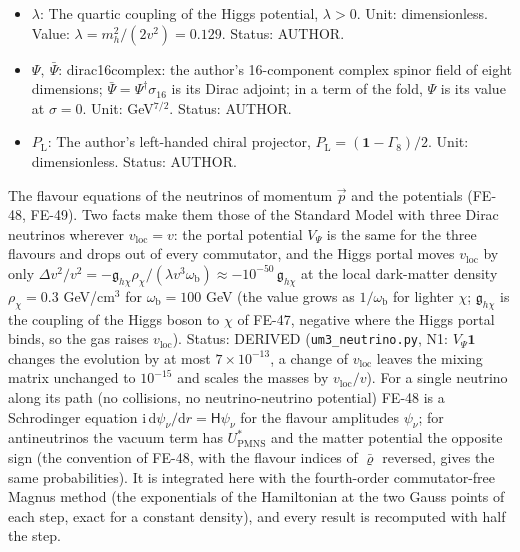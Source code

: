 \documentclass[
  10pt,
]{article}
\begin{document}
\begin{itemize}
  \(c_\Phi\): The Higgs-portal coupling of the left-handed half of
  dirac16complex (the right-handed half has none). Unit: GeV\(^{-5}\).
  Status: INVENTED.
\item
  \(\lambda\): The quartic coupling of the Higgs potential,
  \(\lambda > 0\). Unit: dimensionless. Value:
  \(\lambda = m_h^2/(2v^2) = 0.129\). Status: AUTHOR.
\item
  \(\Psi,\ \bar\Psi\): dirac16complex: the author's 16-component complex
  spinor field of eight dimensions;
  \(\bar\Psi = \Psi^\dagger\sigma_{16}\) is its Dirac adjoint; in a term
  of the fold, \(\Psi\) is its value at \(\sigma = 0\). Unit:
  GeV\(^{7/2}\). Status: AUTHOR.
\item
  \(P_{\mathrm{L}}\): The author's left-handed chiral projector,
  \(P_{\mathrm{L}} = (\mathbf{1} - \Gamma_8)/2\). Unit: dimensionless.
  Status: AUTHOR.
\end{itemize}

The flavour equations of the neutrinos of momentum \(\vec p\) and the
potentials (FE-48, FE-49). Two facts make them those of the Standard
Model with three Dirac neutrinos wherever \(v_{\mathrm{loc}} = v\): the
portal potential \(V_\Psi\) is the same for the three flavours and drops
out of every commutator, and the Higgs portal moves \(v_{\mathrm{loc}}\)
by only
\(\Delta v^2/v^2 = -\mathfrak{g}_{h\chi}\rho_\chi/(\lambda v^3\omega_{\mathrm{b}}) \approx -10^{-50}\,\mathfrak{g}_{h\chi}\)
at the local dark-matter density \(\rho_\chi = 0.3\) GeV/cm\(^3\) for
\(\omega_{\mathrm{b}} = 100\) GeV (the value grows as
\(1/\omega_{\mathrm{b}}\) for lighter \(\chi\); \(\mathfrak{g}_{h\chi}\)
is the coupling of the Higgs boson to \(\chi\) of FE-47, negative where
the Higgs portal binds, so the gas raises \(v_{\mathrm{loc}}\)). Status:
DERIVED (\texttt{um3\_neutrino.py}, N1: \(V_\Psi\mathbf{1}\) changes the
evolution by at most \(7\times10^{-13}\), a change of
\(v_{\mathrm{loc}}\) leaves the mixing matrix unchanged to \(10^{-15}\)
and scales the masses by \(v_{\mathrm{loc}}/v\)). For a single neutrino
along its path (no collisions, no neutrino-neutrino potential) FE-48 is
a Schrodinger equation
\(\mathrm{i}\,\mathrm{d}\psi_\nu/\mathrm{d}r = \mathsf{H}\psi_\nu\) for
the flavour amplitudes \(\psi_\nu\); for antineutrinos the vacuum term
has \(U_{\mathrm{PMNS}}^*\) and the matter potential the opposite sign
(the convention of FE-48, with the flavour indices of \(\bar\varrho\)
reversed, gives the same probabilities). It is integrated here with the
fourth-order commutator-free Magnus method (the exponentials of the
Hamiltonian at the two Gauss points of each step, exact for a constant
density), and every result is recomputed with half the step.
\end{document}
